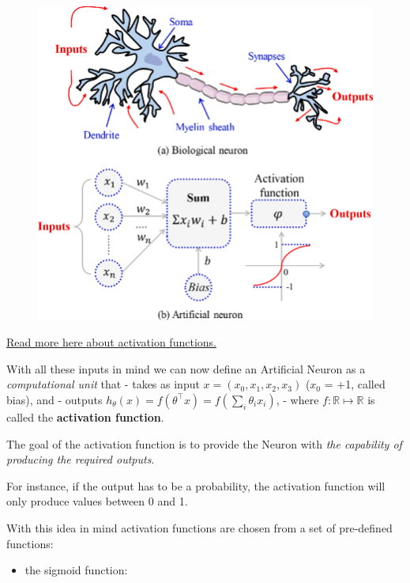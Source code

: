 \documentclass[
  letterpaper,
  DIV=11,
  numbers=noendperiod,
  oneside]{scrartcl}
\providecommand{\tightlist}{%
  \setlength{\itemsep}{0pt}\setlength{\parskip}{0pt}}\usepackage{longtable,booktabs,array}
\begin{document}
\begin{figure}[H]

{\centering \includegraphics[width=1\textwidth,height=\textheight]{images/ActivationFunction0.png}

}

\end{figure}

\href{https://towardsdatascience.com/everything-you-need-to-know-about-activation-functions-in-deep-learning-models-84ba9f82c253}{Read
more here about activation functions.}

With all these inputs in mind we can now define an Artificial Neuron as
a \emph{computational unit} that - takes as input
\(x=(x_0,x_1,x_2,x_3)\) (\(x_0\) = +1, called bias), and - outputs
\(h_{\theta}(x) = f(\theta^\intercal x) = f(\sum_i \theta_ix_i)\), -
where \(f:\mathbb{R}\mapsto \mathbb{R}\) is called the
\textbf{activation function}.

The goal of the activation function is to provide the Neuron with
\emph{the capability of producing the required outputs}.

For instance, if the output has to be a probability, the activation
function will only produce values between 0 and 1.

With this idea in mind activation functions are chosen from a set of
pre-defined functions:

\begin{itemize}
\tightlist
\item
  the sigmoid function:
\end{itemize}
\end{document}
